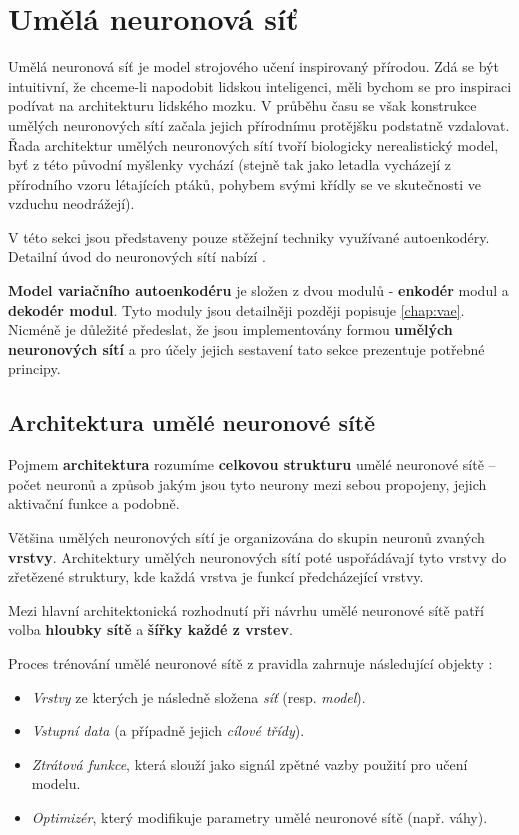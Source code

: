 \section{Umělá neuronová síť}
\label{neural_network}
Umělá neuronová síť je model strojového učení inspirovaný přírodou.
Zdá se být intuitivní, že chceme-li napodobit lidskou inteligenci, měli bychom se pro inspiraci podívat na architekturu lidského mozku.
V průběhu času se však konstrukce umělých neuronových sítí začala jejich přírodnímu protějšku podstatně vzdalovat.
Řada architektur umělých neuronových sítí tvoří biologicky nerealistický model, byť z této původní myšlenky vychází (stejně tak jako letadla vycházejí z přírodního vzoru létajících ptáků, pohybem svými křídly se ve skutečnosti ve vzduchu neodrážejí). \cite{Geron2019}

V této sekci jsou představeny pouze stěžejní techniky využívané autoenkodéry. Detailní úvod do neuronových sítí nabízí \textcite{Chollet2017, Geron2019}.

\textbf{Model variačního autoenkodéru} je složen z dvou modulů - \textbf{enkodér} modul a \textbf{dekodér modul}.
Tyto moduly jsou detailněji později popisuje \autoref{chap:vae}.
Nicméně je důležité předeslat, že jsou implementovány formou \textbf{umělých neuronových sítí} a pro účely jejich sestavení tato sekce prezentuje potřebné principy.

\subsection{Architektura umělé neuronové sítě}
\label{sec:neural_network_architecture}
Pojmem \textbf{architektura} rozumíme \textbf{celkovou strukturu} umělé neuronové sítě – počet neuronů a způsob jakým jsou tyto neurony mezi sebou propojeny, jejich aktivační funkce a podobně.

Většina umělých neuronových sítí je organizována do skupin neuronů zvaných \textbf{vrstvy}.
Architektury umělých neuronových sítí poté uspořádávají tyto vrstvy do zřetězené struktury, kde každá vrstva je funkcí předcházející vrstvy. \cite{Goodfellow2016}

Mezi hlavní architektonická rozhodnutí při návrhu umělé neuronové sítě patří volba \textbf{hloubky sítě} a \textbf{šířky každé z vrstev}.

Proces trénování umělé neuronové sítě z pravidla zahrnuje následující objekty \cite{Chollet2017}:
\begin{itemize}
    \item \emph{Vrstvy} ze kterých je následně složena \emph{síť} (resp. \emph{model}).
    \item \emph{Vstupní data} (a případně jejich \emph{cílové třídy}).
    \item \emph{Ztrátová funkce}, která slouží jako signál zpětné vazby použití pro učení modelu.
    \item \emph{Optimizér}, který modifikuje parametry umělé neuronové sítě (např. váhy).
\end{itemize}

